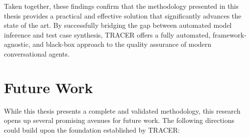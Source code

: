Taken together, these findings confirm
that the methodology presented in this thesis
provides a practical and effective solution
that significantly advances the state of the art.
By successfully bridging the gap
between automated model inference and test case synthesis,
\ac{TRACER} offers a fully automated, framework-agnostic, and black-box approach
to the quality assurance of modern conversational agents.

\section{Future Work}

While this thesis presents a complete and validated methodology,
this research opens up several promising avenues for future work.
The following directions could build upon the foundation established by \ac{TRACER}:

